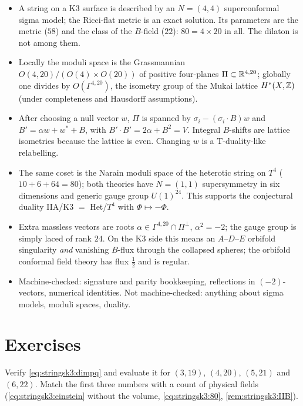 \begin{summarybox}
\begin{itemize}[leftmargin=*]
\item A string on a K3 surface is described by an $N=(4,4)$ superconformal sigma model; the
  Ricci-flat metric is an exact solution. Its parameters are the metric ($58$) and the class
  of the $B$-field ($22$): $80=4\times20$ in all. The dilaton is not among them.
\item Locally the moduli space is the Grassmannian $O(4,20)/(O(4)\times O(20))$ of positive
  four-planes $\Pi\subset\mathbb{R}^{4,20}$; globally one divides by $O(\Gamma^{4,20})$, the isometry
  group of the Mukai lattice $H^*(X,\mathbb{Z})$ (under completeness and Hausdorff assumptions).
\item After choosing a null vector $w$, $\Pi$ is spanned by $\sigma_i-(\sigma_i\cdot B)w$ and
  $B'=\alpha w+w^*+B$, with $B'\cdot B'=2\alpha+B^2=V$. Integral $B$-shifts are lattice isometries
  because the lattice is even. Changing $w$ is a T-duality-like relabelling.
\item The same coset is the Narain moduli space of the heterotic string on $T^4$
  ($10+6+64=80$); both theories have $N=(1,1)$ supersymmetry in six dimensions and generic
  gauge group $U(1)^{24}$. This supports the conjectural duality IIA/K3 $=$ Het/$T^4$ with
  $\Phi\mapsto-\Phi$.
\item Extra massless vectors are roots $\alpha\in\Gamma^{4,20}\cap\Pi^\perp$, $\alpha^2=-2$;
  the gauge group is simply laced of rank $24$. On the K3 side this means an $A$--$D$--$E$
  orbifold singularity \emph{and} vanishing $B$-flux through the collapsed spheres; the
  orbifold conformal field theory has flux $\tfrac12$ and is regular.
\item Machine-checked: signature and parity bookkeeping, reflections in $(-2)$-vectors,
  numerical identities. Not machine-checked: anything about sigma models, moduli spaces, duality.
\end{itemize}
\end{summarybox}

\section*{Exercises}

\begin{exercise}[$\star$]\label{exo:stringsk3:dims}
Verify \eqref{eq:stringsk3:dimpq} and evaluate it for $(3,19)$, $(4,20)$, $(5,21)$ and $(6,22)$.
Match the first three numbers with a count of physical fields
(\eqref{eq:stringsk3:einstein} without the volume, \eqref{eq:stringsk3:80},
\cref{rem:stringsk3:IIB}).
\end{exercise}

